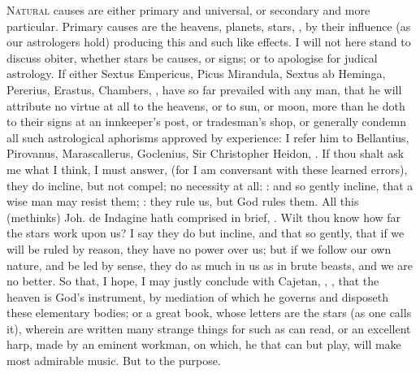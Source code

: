 {{\lettrine{N}{atural} causes are either primary and universal, or secondary and more
particular. Primary causes are the heavens, planets, stars, \etc{}, by
their influence (as our astrologers hold) producing this and such like
effects. I will not here stand to discuss obiter, whether stars be
causes, or signs; or to apologise for judical astrology. If either
Sextus Empericus, Picus Mirandula, Sextus ab Heminga, Pererius,
Erastus, Chambers, \etc{}, have so far prevailed with any man, that he
will attribute no virtue at all to the heavens, or to sun, or moon,
more than he doth to their signs at an innkeeper's post, or tradesman's
shop, or generally condemn all such astrological aphorisms approved by
experience: I refer him to Bellantius, Pirovanus, Marascallerus,
Goclenius, Sir Christopher Heidon, \etc{}. If thou shalt ask me what I
think, I must answer,  (for
I am conversant with these learned errors), they do incline, but not
compel; no necessity at all: : and so gently
incline, that a wise man may resist them; :
they rule us, but God rules them. All this (methinks) Joh. de
Indagine hath comprised in brief,  \etc{}. Wilt thou know how far the stars work upon us? I
say they do but incline, and that so gently, that if we will be ruled
by reason, they have no power over us; but if we follow our own nature,
and be led by sense, they do as much in us as in brute beasts, and we
are no better. So that, I hope, I may justly conclude with
Cajetan, , \etc{}, that the
heaven is God's instrument, by mediation of which he governs and
disposeth these elementary bodies; or a great book, whose letters are
the stars (as one calls it), wherein are written many strange things
for such as can read, or an excellent harp, made by an eminent
workman, on which, he that can but play, will make most admirable
music. But to the purpose.

}}
